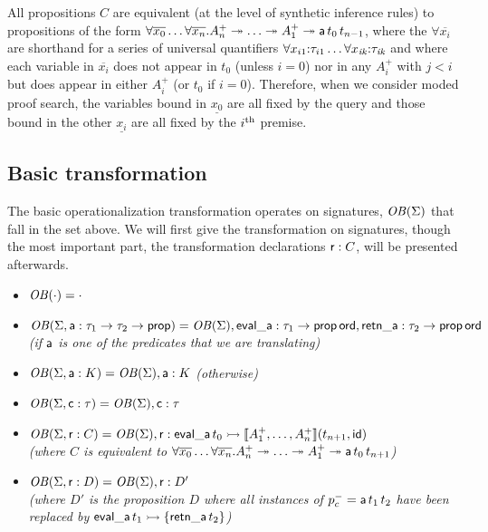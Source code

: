 All propositions $C$ are equivalent (at the level of synthetic
inference rules) to propositions of the form $\forall
\overline{x_0}\ldots \forall \overline{x_n}. A^+_n \twoheadrightarrow \ldots
\twoheadrightarrow A^+_1 \twoheadrightarrow {\sf a}\,t_{0}\,t_{n-1}$,
where the $\forall \overline{x_i}$ are shorthand for a series of
universal quantifiers $\forall {x_{i1}}{:}{\tau_{i1}} \ldots \forall
{x_{\it ik}}{:}{\tau_{\it ik}}$ and where each variable in
$\overline{x_i}$ does not appear in $t_0$ (unless $i = 0$)
nor in any $A^+_i$ with $j < i$ but does appear in either $A^+_i$ (or
$t_0$ if $i = 0$). Therefore, when we consider moded proof
search, the variables bound in $\underline{x_0}$ are all fixed by the
query and those bound in the other $\underline{x_i}$ are all fixed by
the $i^{\rm th}$ premise.

\subsection{Basic transformation}
\label{sec:trans-basic}

The basic operationalization transformation operates on signatures,
${\it OB}({\Sigma})$ that fall in the set above. We will first give
the transformation on signatures, though the most important part, the
transformation declarations ${\sf r} : C$, will be presented
afterwards.

\begin{itemize}
\item ${\it OB}({\cdot}) = \cdot$
\item ${\it OB}({\Sigma, {\sf a} : \tau_1 \rightarrow \tau_2
    \rightarrow {\sf prop}}) = {\it OB}({\Sigma}), {\sf eval\_a} :
  \tau_1 \rightarrow {\sf prop\,ord}, {\sf retn\_a} : \tau_2
  \rightarrow {\sf prop\,ord}$ \\ {\it (if $\sf a$ is one of the
    predicates that we are translating)}
\item ${\it OB}({\Sigma, {\sf a} : K}) = {\it OB}({\Sigma}), {\sf a}
  : K$ {\it (otherwise)}
\item ${\it OB}({\Sigma, {\sf c} : \tau}) = {\it OB}({\Sigma}), {\sf
    c} : \tau$ 
\item ${\it OB}({\Sigma, {\sf r} : C}) = {\it OB}({\Sigma}), {\sf r}
  : {\sf eval\_a}\,t_0 \rightarrowtail \llbracket A^+_1, \ldots, A^+_n
  \rrbracket (t_{n+1}, {\sf id})$ \\ {\it (where $C$ is equivalent
    to $\forall \overline{x_0}\ldots \forall \overline{x_n}. A^+_n
    \twoheadrightarrow \ldots \twoheadrightarrow A^+_1 \twoheadrightarrow {\sf a}\,t_{0}\,t_{n+1}$)}
\item ${\it OB}({\Sigma, {\sf r} : D}) = {\it OB}({\Sigma}), {\sf r}
  : D'$\\{\it (where $D'$ is the proposition $D$ where all instances of
  $p^-_c = {\sf a}\,t_1\,t_2$ have been replaced by ${\sf
    eval\_a}\,t_1 \rightarrowtail \{ {\sf retn\_a}\,t_2 \}$)}
\end{itemize}

